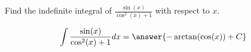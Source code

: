 \documentclass{ximera}
\author{Gregory Hartman \and Matthew Carr}
\begin{document}
\begin{exercise}

Find the indefinite integral of $\frac{\sin(x)}{\cos^{2}(x)+1}$ with respect to $x$.

\[
\int \frac{\sin(x)}{\cos^{2}(x)+1} dx=\answer{-\arctan(\cos(x))+C}
\]


\end{exercise}
\end{document}
